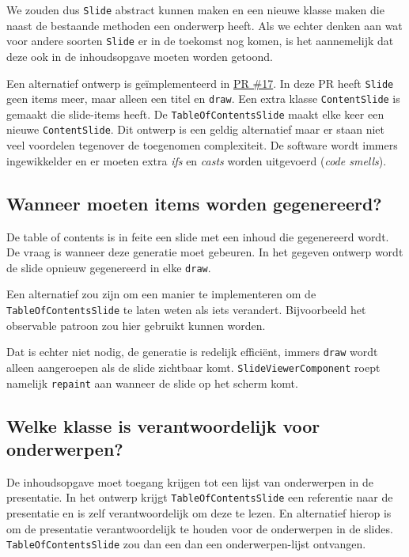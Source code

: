 \documentclass[a4paper]{article}
\newcommand{\question}[1]{
  \subsection{#1}
}
\newcommand{\code}[1]{\lstinline[columns=fixed]{#1}}
\begin{document}
    We zouden dus \code{Slide} abstract kunnen maken en een nieuwe klasse maken die naast de bestaande methoden een onderwerp heeft.
    Als we echter denken aan wat voor andere soorten \code{Slide} er in de toekomst nog komen, is het aannemelijk dat deze ook in de inhoudsopgave moeten worden getoond.
    
    Een alternatief ontwerp is geïmplementeerd in \hyperlink{https://github.com/DanielSchiavini/design-patterns-assignment/pull/17}{PR \#17}.
    In deze PR heeft \code{Slide} geen items meer, maar alleen een titel en \code{draw}.
    Een extra klasse \code{Content}\-\code{Slide} is gemaakt die slide-items heeft.
    De \code{TableOfContentsSlide} maakt elke keer een nieuwe \code{ContentSlide}.
    Dit ontwerp is een geldig alternatief maar er staan niet veel voordelen tegenover de toegenomen complexiteit.
    De software wordt immers ingewikkelder en er moeten extra \textit{ifs} en \textit{casts} worden uitgevoerd (\textit{code smells}).



    \question{Wanneer moeten items worden gegenereerd?}
    De table of contents is in feite een slide met een inhoud die gegenereerd wordt.
    De vraag is wanneer deze generatie moet gebeuren.
    In het gegeven ontwerp wordt de slide opnieuw gegenereerd in elke \code{draw}.
    
    Een alternatief zou zijn om een manier te implementeren om de \code{TableOf}\-\code{ContentsSlide} te laten weten als iets verandert.
    Bijvoorbeeld het observable patroon zou hier gebruikt kunnen worden.
    
    Dat is echter niet nodig, de generatie is redelijk efficiënt, immers \code{draw} wordt alleen aangeroepen als de slide zichtbaar komt.
    \code{SlideViewerComponent} roept namelijk \code{repaint} aan wanneer de slide op het scherm komt.
    
    \question{Welke klasse is verantwoordelijk voor onderwerpen?}
    De inhoudsopgave moet toegang krijgen tot een lijst van onderwerpen in de presentatie.
    In het ontwerp krijgt \code{TableOfContentsSlide} een referentie naar de presentatie en is zelf verantwoordelijk om deze te lezen.
    En alternatief hierop is om de presentatie verantwoordelijk te houden voor de onderwerpen in de slides.
    \code{TableOfContentsSlide} zou dan een dan een onderwerpen-lijst ontvangen.
\end{document}
